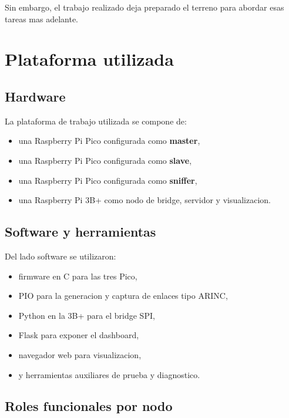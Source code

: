 \documentclass[12pt,a4paper,oneside]{report}
\begin{document}
Sin embargo, el trabajo realizado deja preparado el terreno para abordar esas tareas mas adelante.

\chapter{Plataforma utilizada}

\section{Hardware}

La plataforma de trabajo utilizada se compone de:

\begin{itemize}[leftmargin=1.2cm]
    \item una Raspberry Pi Pico configurada como \textbf{master},
    \item una Raspberry Pi Pico configurada como \textbf{slave},
    \item una Raspberry Pi Pico configurada como \textbf{sniffer},
    \item una Raspberry Pi 3B+ como nodo de bridge, servidor y visualizacion.
\end{itemize}

\section{Software y herramientas}

Del lado software se utilizaron:

\begin{itemize}[leftmargin=1.2cm]
    \item firmware en C para las tres Pico,
    \item PIO para la generacion y captura de enlaces tipo ARINC,
    \item Python en la 3B+ para el bridge SPI,
    \item Flask para exponer el dashboard,
    \item navegador web para visualizacion,
    \item y herramientas auxiliares de prueba y diagnostico.
\end{itemize}

\section{Roles funcionales por nodo}
\end{document}
